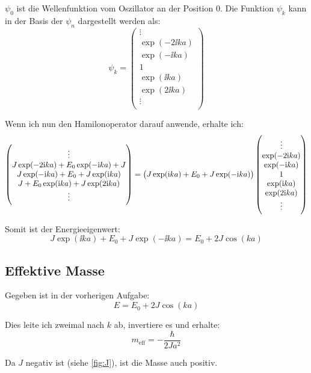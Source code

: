 $\psi_0$ ist die Wellenfunktion vom Oszillator an der Position 0. Die Funktion $\psi_k$ kann in der Basis der $\psi_n$ dargestellt werden als:
\[
	\psi_k =
	\begin{pmatrix}
		\vdots \\
		\exp(-2 \ii k a) \\
		\exp(- \ii k a) \\
		1 \\
		\exp(\ii k a) \\
		\exp(2 \ii k a) \\
		\vdots \\
	\end{pmatrix}
\]

Wenn ich nun den Hamilonoperator darauf anwende, erhalte ich:
\[
	\begin{pmatrix}
		\vdots \\
		J \exp(-2\ii ka) + E_0 \exp(-\ii ka) + J \\
		J \exp(-\ii ka) + E_0 + J \exp(\ii ka) \\
		J + E_0 \exp(\ii ka) + J \exp(2\ii ka) \\
		\vdots \\
	\end{pmatrix}
	=
	\del{J \exp(\ii ka) + E_0 + J \exp(-\ii ka)}
	\begin{pmatrix}
		\vdots \\
		\exp(-2 \ii k a) \\
		\exp(- \ii k a) \\
		1 \\
		\exp(\ii k a) \\
		\exp(2 \ii k a) \\
		\vdots \\
	\end{pmatrix}
\]

Somit ist der Energieeigenwert:
\[
	J \exp(\ii ka) + E_0 + J \exp(-\ii ka)
	=
	E_0 + 2 J \cos(ka)
\]

\subsection{Effektive Masse}

Gegeben ist in der vorherigen Aufgabe:
\[
	E = E_0 + 2 J \cos(ka)
\]

Dies leite ich zweimal nach $k$ ab, invertiere es und erhalte:
\[
	m_\text{eff} = - \frac{\hbar}{2Ja^2}
\]

Da $J$ negativ ist (siehe \cref{fig:J}), ist die Masse auch positiv.


\IfFileExists{\bibliographyfile}{
	
}{}




